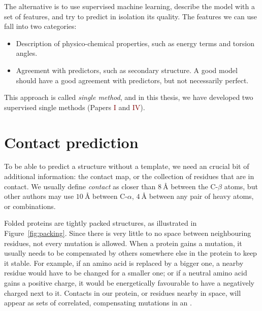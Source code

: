 The alternative is to use supervised machine learning,
describe the model with a set of features, and try to predict in isolation its quality.
The features we can use fall into two categories:

\begin{itemize}
\item Description of physico-chemical properties, such as energy terms and torsion angles.
\item Agreement with predictors, such as secondary structure. A good model should have a good agreement with predictors, but not necessarily perfect.
\end{itemize}

This approach is called \emph{single method}, and in this thesis, we have developed two supervised single methods (Papers \textcolor{Maroon}{I} and \textcolor{Maroon}{IV}).


\section{Contact prediction}\label{sec:contacts}
To be able to predict a structure without a template, we need an crucial  bit of additional information: the contact map, or the collection of residues that are in contact.
We usually define \emph{contact}  as closer than $\SI{8}{\angstrom}$ between the C-$\beta$ atoms,
but other authors may use $\SI{10}{\angstrom}$ between C-$\alpha$, $\SI{4}{\angstrom}$ between any pair of heavy atoms, or combinations.

Folded proteins  are tightly packed structures, as illustrated in Figure~\ref{fig:packing}.
Since there is very little to no space between neighbouring residues, not every mutation is allowed.
When a protein gains a mutation, it usually needs to be compensated by others somewhere else in the protein to keep it stable.
For example, if an amino acid is replaced by a bigger one, a nearby residue would have to be changed for a smaller one; or if a neutral amino acid gains a positive charge, it would be energetically favourable to have a negatively charged next to it.
Contacts in our protein, or residues nearby in space, will appear as sets of correlated, compensating mutations in an \MSA.

